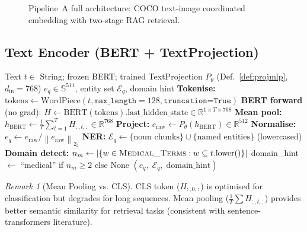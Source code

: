 \documentclass[12pt,a4paper]{article}
\theoremstyle{definition}
\theoremstyle{plain}
\theoremstyle{remark}
\newtheorem{remark}{Remark}[section]
\newcommand{\R}{\mathbb{R}}
\newcommand{\Sph}{\mathbb{S}}
\newcommand{\Norm}[1]{\left\|#1\right\|_2}
\begin{document}
\begin{figure}[H]
{
}
\caption{Pipeline~A full architecture: COCO text-image coordinated embedding with two-stage RAG retrieval.}
\label{fig:pipeline_a}
\end{figure}

\subsection{Text Encoder (BERT + TextProjection)}

\begin{algorithm}[H]
\caption{TextEncoderV2.encode — BERT Mean-Pool + TextProjection}
\label{alg:textencode}
\begin{algorithmic}[1]
\Require Text $t \in$ String; frozen BERT; trained TextProjection $P_\theta$ (Def.~\ref{def:projmlp}, $d_{\text{in}}=768$)
\Ensure $e_q \in \Sph^{511}$, entity set $\mathcal{E}_q$, domain hint
\State \textbf{Tokenise:} $\text{tokens} \gets \text{WordPiece}(t, \texttt{max\_length}=128, \texttt{truncation=True})$
\State \textbf{BERT forward} (no grad):
  $H \gets \text{BERT}(\text{tokens}).\text{last\_hidden\_state} \in \R^{1 \times T \times 768}$
\State \textbf{Mean pool:} $h_{\text{BERT}} \gets \frac{1}{T}\sum_{t=1}^T H_{:,t,:} \in \R^{768}$
\State \textbf{Project:} $e_{\text{raw}} \gets P_\theta(h_{\text{BERT}}) \in \R^{512}$
\State \textbf{Normalise:} $e_q \gets e_{\text{raw}} / \Norm{e_{\text{raw}}}_2$
\State \textbf{NER:} $\mathcal{E}_q \gets \{\text{noun chunks}\} \cup \{\text{named entities}\}$ (lowercased)
\State \textbf{Domain detect:} $n_m \gets |\{w \in \textsc{Medical\_Terms} : w \subseteq t.\text{lower}()\}|$
\State domain\_hint $\gets$ ``medical'' if $n_m \ge 2$ else None
\State \Return $(e_q,\; \mathcal{E}_q,\; \text{domain\_hint})$
\end{algorithmic}
\end{algorithm}

\begin{remark}[Mean Pooling vs. CLS]
CLS token ($H_{:,0,:}$) is optimised for classification but degrades for long sequences. Mean pooling ($\frac{1}{T}\sum H_{:,t,:}$) provides better semantic similarity for retrieval tasks (consistent with sentence-transformers literature).
\end{remark}
\end{document}

